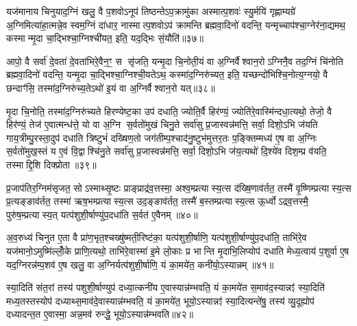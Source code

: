 यज॑मानाय चिनुयाद॒ग्निं खलु॒ वै प॒शवोऽनूप॑ तिष्ठन्तेऽप॒क्रामु॑का अस्मात्प॒शवः॑ स्यु॒र्मयि॑ गृह्णाम्यग्रे॑ अ॒ग्निमित्या॑हा॒त्मन्ने॒व स्वम॒ग्निं दा॑धार॒ नास्मात्प॒शवोऽप॑ क्रामन्ति ब्रह्मवा॒दिनो॑ वदन्ति॒ यन्मृच्चाप॑श्चा॒ग्नेर॑ना॒द्यमथ॒ कस्मान्मृ॒दा चा॒द्भिश्चा॒ग्निश्ची॑यत॒ इति॒ यद॒द्भिः सं॒यौति॑॥३७॥

आपो॒ वै सर्वा॑ दे॒वता॑ दे॒वता॑भिरे॒वैन॒ꣳ॒ स सृ॑जति॒ यन्मृ॒दा चि॒नोती॒यं वा अ॒ग्निर्वैश्वान॒रोऽग्निनै॒व तद॒ग्निं चि॑नोति ब्रह्मवा॒दिनो॑ वदन्ति॒ यन्मृ॒दा चा॒द्भिश्चा॒ग्निश्ची॒यतेऽथ॒ कस्मा॑द॒ग्निरु॑च्यत॒ इति॒ यच्छन्दो॑भिश्चि॒नोत्य॒ग्नयो॒ वै छन्दाꣳ॑सि॒ तस्मा॑द॒ग्निरु॑च्य॒तेऽथो॑ इ॒यं वा अ॒ग्निर्वैश्वान॒रो यत्॥३८॥

मृ॒दा चि॒नोति॒ तस्मा॑द॒ग्निरु॑च्यते हिरण्येष्ट॒का उप॑ दधाति॒ ज्योति॒र्वै हिर॑ण्यं॒ ज्योति॑रे॒वास्मि॑न्दधा॒त्यथो॒ तेजो॒ वै हिर॑ण्यं॒ तेज॑ ए॒वात्मन्ध॑त्ते॒ यो वा अ॒ग्नि स॒र्वतो॑मुखं चिनु॒ते सर्वा॑सु प्र॒जास्वन्न॑मत्ति॒ सर्वा॒ दिशो॒ऽभि ज॑यति गाय॒त्रीम्पु॒रस्ता॒दुप॑ दधाति त्रिष्टुभं॑ दख्षिण॒तो जग॑तीम्प॒श्चाद॑नु॒ष्टुभ॑मुत्तर॒तः प॒ङ्क्तिम्मध्य॑ ए॒ष वा अ॒ग्निः स॒र्वतो॑मुख॒स्तं य ए॒वं वि॒द्वाश्चि॑नु॒ते सर्वा॑सु प्र॒जास्वन्न॑मत्ति॒ सर्वा॒ दिशो॒ऽभि ज॑य॒त्यथो॑ दि॒श्ये॑व दिश॒म्प्र व॑यति॒ तस्माद्दि॒शि दिक्प्रोता॥३९॥

{\anuvakamend[{अपि॑ सं॒ यौति॑ वैश्वान॒रो यदे॒ष वै पञ्च॑विशतिश्च॥९॥}]}

प्र॒जाप॑तिर॒ग्निम॑सृजत॒ सोऽस्माथ्सृ॒ष्टः प्राङ्प्राद्र॑व॒त्तस्मा॒ अश्व॒म्प्रत्यास्य॒त्स द॑ख्षि॒णाव॑र्तत॒ तस्मै॑ वृ॒ष्णिम्प्रत्यास्य॒त्स प्र॒त्यङ्ङाव॑र्तत॒ तस्मा॑ ऋष॒भम्प्रत्यास्य॒त्स उद॒ङ्ङाव॑र्तत॒ तस्मै॑ ब॒स्तम्प्रत्यास्य॒त्स ऊ॒र्ध्वोऽद्रव॒त्तस्मै॒ पुरु॑ष॒म्प्रत्यास्य॒त् यत्प॑शुशी॒र्\mbox{}षाण्यु॑प॒दधा॑ति स॒र्वत॑ ए॒वैनम्॥४०॥

अ॒व॒रुध्य॑ चिनुत ए॒ता वै प्रा॑ण॒भृत॒श्चख्षु॑ष्मती॒रिष्ट॑का॒ यत्प॑शुशी॒र्\mbox{}षाणि॒ यत्प॑शुशी॒र्\mbox{}षाण्यु॑प॒दधा॑ति॒ ताभि॑रे॒व यज॑मानो॒ऽमुष्मि॑ल्लोँ॒के प्राणि॒त्यथो॒ ताभि॑रे॒वास्मा॑ इ॒मे लो॒काः प्र भान्ति मृ॒दाभि॒लिप्योप॑ दधाति मेध्य॒त्वाय॑ प॒शुर्वा ए॒ष यद॒ग्निरन्न॑म्प॒शव॑ ए॒ष खलु॒ वा अ॒ग्निर्यत्प॑शुशी॒र्\mbox{}षाणि॒ यं का॒मये॑त॒ कनी॑यो॒ऽस्यान्नम्॥४१॥

स्या॒दिति॑ संत॒रां तस्य॑ पशुशी॒र्\mbox{}षाण्युप॑ दध्या॒त्कनी॑य ए॒वास्यान्न॑म्भवति॒ यं का॒मये॑त स॒माव॑द॒स्यान्नꣵ॑ स्या॒दिति॑ मध्य॒तस्तस्योप॑ दध्याथ्स॒माव॑दे॒वास्यान्न॑म्भवति॒ यं का॒मये॑त॒ भूयो॒ऽस्यान्नꣵ॑ स्या॒दित्यन्ते॑षु॒ तस्य॑ व्यु॒दूह्योप॑ दध्यादन्त॒त ए॒वास्मा॒ अन्न॒मव॑ रुन्द्धे॒ भूयो॒ऽस्यान्न॑म्भवति॥४२॥

{\anuvakamend[{ए॒न॒म॒स्यान्न॒म्भूयो॒स्यान्न॑म्भवति॥10॥}]}

